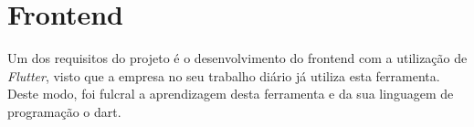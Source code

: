 \section{Frontend}
Um dos requisitos do projeto é o desenvolvimento do frontend com a utilização de \textit{Flutter}, visto que a empresa no seu trabalho diário já utiliza esta ferramenta. Deste modo, foi fulcral a aprendizagem desta ferramenta e da sua linguagem de programação o dart.



\newpage 



\newpage



